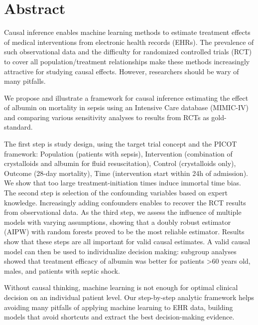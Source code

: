 \documentclass[10pt,letterpaper]{article}
\begin{document}
\section*{Abstract}

Causal inference enables machine learning methods to estimate treatment effects
of medical interventions from electronic health records (EHRs). The prevalence
of such observational data and the difficulty for randomized controlled trials (RCT) to cover all
population/treatment relationships make these methods increasingly attractive
for studying causal effects. However, researchers should be wary of many
pitfalls.

We propose and illustrate a framework for causal inference estimating the
effect of albumin on mortality in sepsis using an Intensive Care database
(MIMIC-IV) and comparing various sensitivity analyses to results from RCTs as gold-standard.

The first step is study design, using the target trial concept and the PICOT
framework: Population (patients with sepsis), Intervention (combination of
crystalloids and albumin for fluid resuscitation), Control (crystalloids only),
Outcome (28-day mortality), Time (intervention start within 24h of admission).
We show that too large treatment-initiation times induce immortal time bias.
The second step is selection of the confounding variables based on expert
knowledge. Increasingly adding confounders enables to recover the RCT results
from observational data. As the third step, we assess the influence
of multiple models with varying assumptions, showing that a doubly robust estimator (AIPW)
with random forests proved to be the most reliable estimator. Results show that
these steps are all important for valid causal estimates. A valid causal model
can then be used to individualize decision making: subgroup analyses showed that
treatment efficacy of albumin was better for patients >60 years old, males, and
patients with septic shock.

Without causal thinking, machine learning is not enough for optimal clinical
decision on an individual patient level. Our step-by-step analytic framework helps avoiding many pitfalls of applying machine learning to EHR data,
building models that avoid shortcuts and extract the best decision-making evidence.

\end{document}
